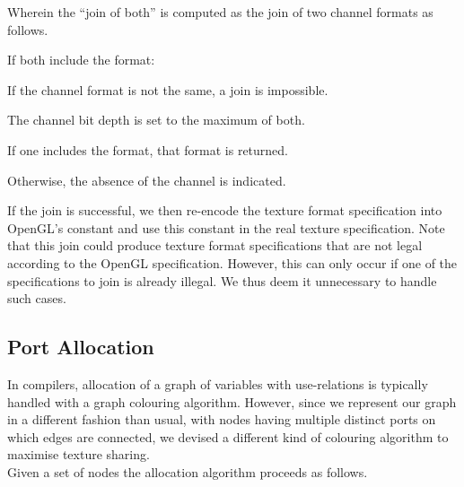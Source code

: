 \documentclass[format=sigconf]{acmart}
\begin{document}
Wherein the ``join of both'' is computed as the join of two channel formats as follows.

\begin{step}
\item If both include the format:
  \begin{step}
  \item If the channel format is not the same, a join is impossible.
  \item The channel bit depth is set to the maximum of both.
  \end{step}
\item If one includes the format, that format is returned.
\item Otherwise, the absence of the channel is indicated.
\end{step}

If the join is successful, we then re-encode the texture format specification into OpenGL's constant and use this constant in the real texture specification. Note that this join could produce texture format specifications that are not legal according to the OpenGL specification. However, this can only occur if one of the specifications to join is already illegal. We thus deem it unnecessary to handle such cases.

\subsection{Port Allocation}\label{port-allocation}
In compilers, allocation of a graph of variables with use-relations is typically handled with a graph colouring algorithm. However, since we represent our graph in a different fashion than usual, with nodes having multiple distinct ports on which edges are connected, we devised a different kind of colouring algorithm to maximise texture sharing. \\

Given a set of nodes the allocation algorithm proceeds as follows.
\end{document}
